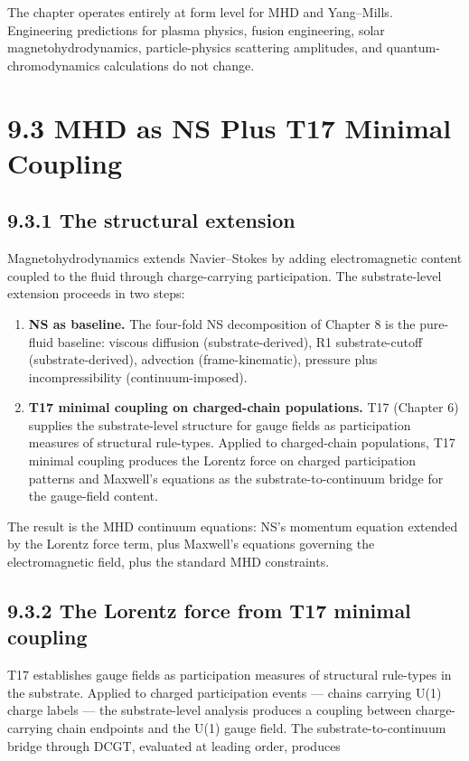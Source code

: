 \documentclass[11pt]{book}
\begin{document}
The chapter operates entirely at form level for MHD and Yang–Mills. Engineering predictions for plasma physics, fusion engineering, solar magnetohydrodynamics, particle-physics scattering amplitudes, and quantum-chromodynamics calculations do not change.

\section{9.3 MHD as NS Plus T17 Minimal Coupling}

\subsection{9.3.1 The structural extension}

Magnetohydrodynamics extends Navier–Stokes by adding electromagnetic content coupled to the fluid through charge-carrying participation. The substrate-level extension proceeds in two steps:

\begin{enumerate}
\item \textbf{NS as baseline.} The four-fold NS decomposition of Chapter 8 is the pure-fluid baseline: viscous diffusion (substrate-derived), R1 substrate-cutoff (substrate-derived), advection (frame-kinematic), pressure plus incompressibility (continuum-imposed).
\item \textbf{T17 minimal coupling on charged-chain populations.} T17 (Chapter 6) supplies the substrate-level structure for gauge fields as participation measures of structural rule-types. Applied to charged-chain populations, T17 minimal coupling produces the Lorentz force on charged participation patterns and Maxwell's equations as the substrate-to-continuum bridge for the gauge-field content.
\end{enumerate}

The result is the MHD continuum equations: NS's momentum equation extended by the Lorentz force term, plus Maxwell's equations governing the electromagnetic field, plus the standard MHD constraints.

\subsection{9.3.2 The Lorentz force from T17 minimal coupling}

T17 establishes gauge fields as participation measures of structural rule-types in the substrate. Applied to charged participation events — chains carrying U(1) charge labels — the substrate-level analysis produces a coupling between charge-carrying chain endpoints and the U(1) gauge field. The substrate-to-continuum bridge through DCGT, evaluated at leading order, produces
\end{document}
